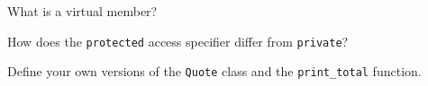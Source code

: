 %
%
\begin{question}
What is a virtual member?
\end{question}

\begin{question}
How does the \verb|protected| access specifier differ from \verb|private|?
\end{question}

\begin{question}\label{qst:your own quote and print-total}
Define your own versions of the \verb|Quote| class and the
\verb|print_total| function.
\end{question}
